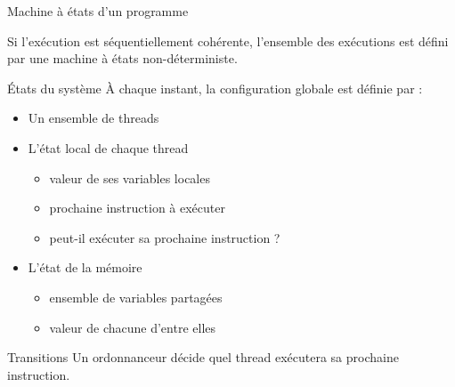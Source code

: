 
\begingroup

\begin{frame}[fragile]{Machine à états d'un programme}

  Si l'exécution est séquentiellement cohérente, l'ensemble des exécutions est défini par une machine à états non-déterministe.

  \begin{block}{États du système}
    À chaque instant, la \alert{configuration globale} est définie par :
    \begin{itemize}
    \item Un ensemble de threads
    \item L'état local de chaque thread
      \begin{itemize}
      \item valeur de ses variables locales
      \item prochaine instruction à exécuter
      \item peut-il exécuter sa prochaine instruction ? 
      \end{itemize}
    \item L'état de la mémoire
      \begin{itemize}
      \item ensemble de variables partagées
      \item valeur de chacune d'entre elles
      \end{itemize}
    \end{itemize}
  \end{block}

  \begin{block}{Transitions}
    Un \alert{ordonnanceur} décide quel thread exécutera sa prochaine instruction.
  \end{block}
\end{frame}

\endgroup
\endinput
